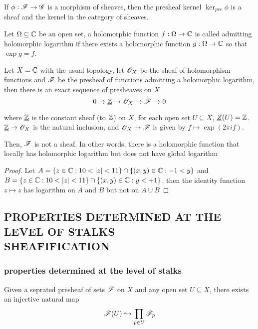 \begin{proposition}
	If $\phi: \mathscr{F} \to \mathscr{G}$ is a morphism of sheaves, then the presheaf kernel $\ker_{pre} \phi$ is a sheaf and the kernel in the category of sheaves.
\end{proposition}

\begin{remark}
	Let $\Omega \subseteq \mathbb{C}$ be an open set, a holomorphic function $f: \Omega \to \mathbb{C}$ is called admitting holomorphic logarithm if there exists a holomorphic function $g: \Omega \to \mathbb{C}$ so that $\exp g = f$.
	
	Let $X = \mathbb{C}$ with the usual topology, let $\mathscr{O}_X$ be the sheaf of holomorphism functions and $\mathscr{F}$ be the presheaf of functions admitting a holomorphic logarithm, then there is an exact sequence of presheaves on $X$
	$$
		0 \to \underline{\mathbb{Z}} \to \mathscr{O}_X \to \mathscr{F} \to 0
	$$
	
	where $\underline{\mathbb{Z}}$ is the constant sheaf (to $\mathbb{Z}$) on $X$, for each open set $U \subseteq X$, $\underline{Z}(U) = \mathbb{Z}$. $\underline{\mathbb{Z}} \to \mathscr{O}_X$ is the natural inclusion, and $\mathscr{O}_X \to \mathscr{F}$ is given by $f \mapsto \exp(2 \pi i f)$.
	
	Then, $\mathscr{F}$ is not a sheaf. In other words, there is a holomorphic function that locally has holomorphic logarithm but does not have global logarithm
\end{remark}

\begin{proof}
	Let $A = \{z \in \mathbb{C}: 10 < |z| < 11\} \cap \{(x, y) \in \mathbb{C}: -1 < y\}$ and $B = \{z \in \mathbb{C}: 10 < |z| < 11\} \cap \{(x, y) \in \mathbb{C}: y < +1\}$, then the identity function $z \mapsto z$ has logarithm on $A$ and $B$ but not on $A \cup B$
\end{proof}

\subsection{PROPERTIES DETERMINED AT THE LEVEL OF STALKS \\ SHEAFIFICATION}

\subsubsection{properties determined at the level of stalks}

\begin{proposition}
	Given a seprated presheaf of sets $\mathscr{F}$ on $X$ and any open set $U \subseteq X$, there exists an injective natural map
	$$
		\mathscr{F}(U) \hookrightarrow \prod_{p \in U} \mathscr{F}_p
	$$
\end{proposition}

